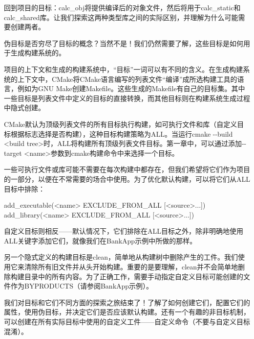 回到项目的目标：calc\_obj将提供编译后的对象文件，然后将用于calc\_static和calc\_shared库。让我们探索这两种类型库之间的实际区别，并理解为什么可能需要创建两者。

伪目标是否穷尽了目标的概念？当然不是！我们仍然需要了解，这些目标是如何用于生成构建系统的。


项目的上下文和生成的构建系统中，“目标”一词可以有不同的含义。在生成构建系统的上下文中，CMake将CMake语言编写的列表文件“编译”成所选构建工具的语言，例如为GNU Make创建Makefile。这些生成的Makefile有自己的目标集。其中一些目标是列表文件中定义的目标的直接转换，而其他目标则在构建系统生成过程中隐式创建。

CMake默认为顶级列表文件的所有目标执行构建，如可执行文件和库（自定义目标根据标志选择是否构建），这种目标构建策略为ALL。当运行cmake -{}-build <build tree>时，ALL将构建所有顶级列表文件目标。第一章中，可以通过添加-{}-target <name>参数到cmake构建命令中来选择一个目标。

一些可执行文件或库可能不需要在每次构建中都存在，但我们希望将它们作为项目的一部分，以便在不常需要的场合中使用。为了优化默认构建，可以将它们从ALL目标中排除：

\begin{shell}
add_executable(<name> EXCLUDE_FROM_ALL [<source>...])
add_library(<name> EXCLUDE_FROM_ALL [<source>...])
\end{shell}

自定义目标则相反——默认情况下，它们排除在ALL目标之外，除非明确地使用ALL关键字添加它们，就像我们在BankApp示例中所做的那样。

另一个隐式定义的构建目标是clean，简单地从构建树中删除产生的工件。我们使用它来清除所有旧文件并从头开始构建。重要的是要理解，clean并不会简单地删除构建目录中的所有内容。为了正确工作，需要手动指定自定义目标可能创建的文件作为BYPRODUCTS（请参阅BankApp示例）。

我们对目标和它们不同方面的探索之旅结束了！了解了如何创建它们，配置它们的属性，使用伪目标，并决定它们是否应该默认构建。还有一个有趣的非目标机制，可以创建在所有实际目标中使用的自定义工件——自定义命令（不要与自定义目标混淆）。

